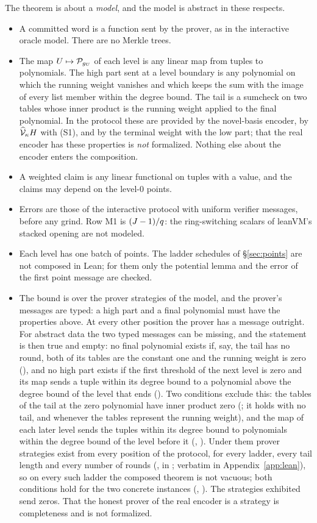 The theorem is about a \emph{model}, and the model is abstract in these respects.
\begin{itemize}[itemsep=1pt,topsep=2pt]
\item A committed word is a function sent by the prover, as in the interactive oracle model. There are no Merkle trees.
\item The map $U\mapsto\mathcal{P}_{g_U}$ of each level is any linear map from tuples to polynomials. The high part sent at a level boundary is any polynomial on which the running weight vanishes and which keeps the sum with the image of every list member within the degree bound. The tail is a sumcheck on two tables whose inner product is the running weight applied to the final polynomial. In the protocol these are provided by the novel-basis encoder, by $\widehat{\mathcal{V}}_{\kappa}H$ with (S1), and by the terminal weight with the low part; that the real encoder has these properties is \emph{not} formalized. Nothing else about the encoder enters the composition.
\item A weighted claim is any linear functional on tuples with a value, and the claims may depend on the level-$0$ points.
\item Errors are those of the interactive protocol with uniform verifier messages, before any grind. Row M1 is $(J-1)/q$: the ring-switching scalars of leanVM's stacked opening are not modeled.
\item Each level has one batch of points. The ladder schedules of \S\ref{sec:points} are not composed in Lean; for them only the potential lemma and the error of the first point message are checked.
\item The bound is over the prover strategies of the model, and the prover's messages are typed: a high part and a final polynomial must have the properties above. At every other position the prover has a message outright. For abstract data the two typed messages can be missing, and the statement is then true and empty: no final polynomial exists if, say, the tail has no round, both of its tables are the constant one and the running weight is zero (), and no high part exists if the first threshold of the next level is zero and its map sends a tuple within its degree bound to a polynomial above the degree bound of the level that ends (). Two conditions exclude this: the tables of the tail at the zero polynomial have inner product zero (; it holds with no tail, and whenever the tables represent the running weight), and the map of each later level sends the tuples within its degree bound to polynomials within the degree bound of the level before it (, ). Under them prover strategies exist from every position of the protocol, for every ladder, every tail length and every number of rounds (,  in ; verbatim in Appendix~\ref{app:lean}), so on every such ladder the composed theorem is not vacuous; both conditions hold for the two concrete instances (, ). The strategies exhibited send zeros. That the honest prover of the real encoder is a strategy is completeness and is not formalized.

\end{itemize}
